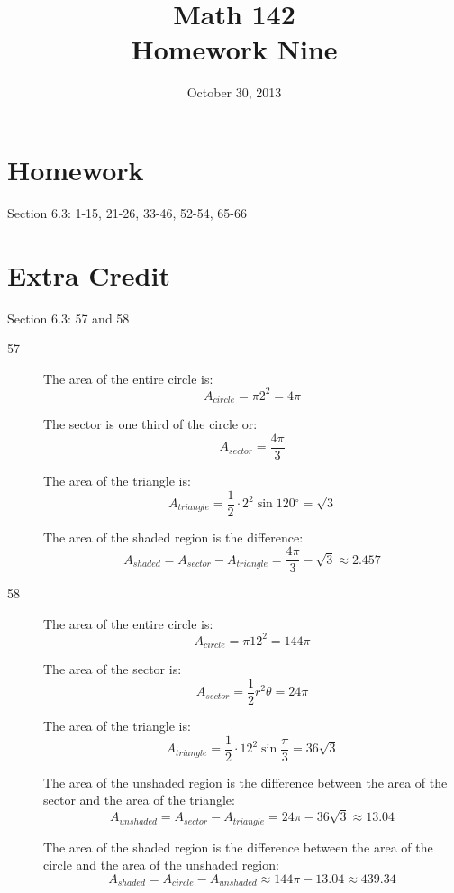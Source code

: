\documentclass{exam}
\author{}
\date{October 30, 2013}
\title{Math 142 \\ Homework Nine}
\newcommand{\dg}{\ensuremath{^\circ}}
\begin{document}
  \maketitle

  \section{Homework}
  Section 6.3: 1-15, 21-26, 33-46, 52-54, 65-66

  \section{Extra Credit}
  Section 6.3: 57 and 58

  \ifprintanswers
    \begin{description}
      \item[57]
        The area of the entire circle is: 
        \[
          A_{circle} = \pi 2^2 = 4 \pi
        \]

        The sector is one third of the circle or: 
        \[
          A_{sector} = \frac{4 \pi}{3}
        \]

        The area of the triangle is: 
        \[
          A_{triangle} = \frac{1}{2} \cdot 2^2 \sin 120 \dg = \sqrt{3}
        \]

        The area of the shaded region is the difference:
        \[
          A_{shaded} = A_{sector} - A_{triangle} = \frac{4 \pi}{3} - \sqrt{3} \approx \boxed{ 2.457 }
        \]

      \item[58]
        The area of the entire circle is: 
        \[
          A_{circle} = \pi 12^2 = 144 \pi
        \]

        The area of the sector is: 
        \[
          A_{sector} = \frac{1}{2} r^2 \theta = 24 \pi
        \]

        The area of the triangle is: 
        \[
          A_{triangle} = \frac{1}{2} \cdot 12^2 \sin \frac{\pi}{3} = 36 \sqrt{3}
        \]

        The area of the unshaded region is the difference between the area of the sector and the area of the triangle:
        \[
          A_{unshaded} = A_{sector} - A_{triangle} = 24 \pi - 36 \sqrt{3} \approx 13.04
        \]

        The area of the shaded region is the difference between the area of the circle and the area of the unshaded
        region:
        \[
          A_{shaded} = A_{circle} - A_{unshaded} \approx 144 \pi - 13.04 \approx \boxed{ 439.34 }
        \]
      \end{description}
\end{document}
